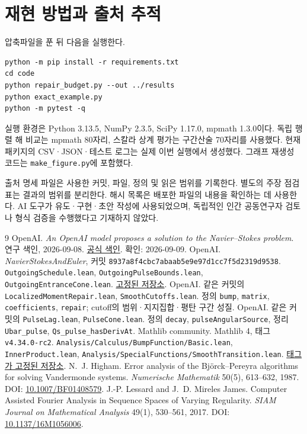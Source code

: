 \documentclass[11pt,a4paper]{article}
\theoremstyle{definition}
\theoremstyle{remark}\newtheorem{remark}[theorem]{주의}
\begin{document}
\section{재현 방법과 출처 추적}
압축파일을 푼 뒤 다음을 실행한다.
\begin{verbatim}
python -m pip install -r requirements.txt
cd code
python repair_budget.py --out ../results
python exact_example.py
python -m pytest -q
\end{verbatim}
실행 환경은 Python 3.13.5, NumPy 2.3.5, SciPy 1.17.0, mpmath 1.3.0이다. 독립 행렬 해 비교는 mpmath 80자리, 스칼라 상계 평가는 구간산술 70자리를 사용했다. 현재 패키지의 CSV·JSON·테스트 로그는 실제 이번 실행에서 생성했다. 그래프 재생성 코드는 \texttt{make\_figure.py}에 포함했다.

출처 명세 파일은 사용한 커밋, 파일, 정의 및 읽은 범위를 기록한다. 별도의 주장 점검표는 결과의 범위를 분리한다. 해시 목록은 배포한 파일의 내용을 확인하는 데 사용한다. AI 도구가 유도·구현·초안 작성에 사용되었으며, 독립적인 인간 공동연구자 검토나 형식 검증을 수행했다고 기재하지 않았다.

\begin{thebibliography}{9}\small
{} OpenAI. \emph{An OpenAI model proposes a solution to the Navier--Stokes problem}. 연구 색인, 2026-09-08. \href{https://openai.com/ko-KR/research/index/publication/}{공식 색인}. 확인: 2026-09-09.
 OpenAI. \emph{NavierStokesAndEuler}, 커밋 \texttt{8937a8f4cbc7abaab5e9e97d1cc7f5d2319d9538}. \texttt{OutgoingSchedule.lean}, \texttt{OutgoingPulseBounds.lean}, \texttt{OutgoingEntranceCone.lean}. \href{https://github.com/openai/NavierStokesAndEuler/tree/8937a8f4cbc7abaab5e9e97d1cc7f5d2319d9538}{고정된 저장소}.
 OpenAI. 같은 커밋의 \texttt{LocalizedMomentRepair.lean}, \texttt{SmoothCutoffs.lean}. 정의 \texttt{bump}, \texttt{matrix}, \texttt{coefficients}, \texttt{repair}; cutoff의 범위·지지집합·평탄 구간 성질.
 OpenAI. 같은 커밋의 \texttt{PulseLag.lean}, \texttt{PulseCone.lean}. 정의 \texttt{decay}, \texttt{pulseAngularSource}, 정리 \texttt{Ubar\_pulse}, \texttt{Qs\_pulse\_hasDerivAt}.
 Mathlib community. Mathlib 4, 태그 \texttt{v4.34.0-rc2}. \texttt{Analysis/Calculus/BumpFunction/Basic.lean}, \texttt{InnerProduct.lean}, \texttt{Analysis/SpecialFunctions/SmoothTransition.lean}. \href{https://github.com/leanprover-community/mathlib4/tree/v4.34.0-rc2}{태그가 고정된 저장소}.
 N.~J. Higham. Error analysis of the Björck--Pereyra algorithms for solving Vandermonde systems. \emph{Numerische Mathematik} 50(5), 613--632, 1987. DOI: \href{https://doi.org/10.1007/BF01408579}{10.1007/BF01408579}.
 J.-P. Lessard and J.~D. Mireles James. Computer Assisted Fourier Analysis in Sequence Spaces of Varying Regularity. \emph{SIAM Journal on Mathematical Analysis} 49(1), 530--561, 2017. DOI: \href{https://doi.org/10.1137/16M1056006}{10.1137/16M1056006}.
\end{thebibliography}
\end{document}
